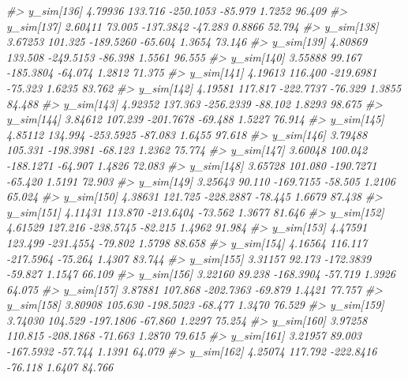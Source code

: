 \documentclass[
  10pt,
  italian,
  a4paper,
  extrafontsizes,onecolumn,openright
  ]{memoir}
\newenvironment{Shaded}{\begin{snugshade}}{\end{snugshade}}
\newcommand{\CommentTok}[1]{\textcolor[rgb]{0.56,0.35,0.01}{\textit{#1}}}
\begin{document}
\begin{Shaded}
\begin{Highlighting}[]
\CommentTok{\#\textgreater{}   y\_sim[136]  4.79936 133.716 {-}250.1053 {-}85.979  1.7252  96.409}
\CommentTok{\#\textgreater{}   y\_sim[137]  2.60411  73.005 {-}137.3842 {-}47.283  0.8866  52.794}
\CommentTok{\#\textgreater{}   y\_sim[138]  3.67253 101.325 {-}189.5260 {-}65.604  1.3654  73.146}
\CommentTok{\#\textgreater{}   y\_sim[139]  4.80869 133.508 {-}249.5153 {-}86.398  1.5561  96.555}
\CommentTok{\#\textgreater{}   y\_sim[140]  3.55888  99.167 {-}185.3804 {-}64.074  1.2812  71.375}
\CommentTok{\#\textgreater{}   y\_sim[141]  4.19613 116.400 {-}219.6981 {-}75.323  1.6235  83.762}
\CommentTok{\#\textgreater{}   y\_sim[142]  4.19581 117.817 {-}222.7737 {-}76.329  1.3855  84.488}
\CommentTok{\#\textgreater{}   y\_sim[143]  4.92352 137.363 {-}256.2339 {-}88.102  1.8293  98.675}
\CommentTok{\#\textgreater{}   y\_sim[144]  3.84612 107.239 {-}201.7678 {-}69.488  1.5227  76.914}
\CommentTok{\#\textgreater{}   y\_sim[145]  4.85112 134.994 {-}253.5925 {-}87.083  1.6455  97.618}
\CommentTok{\#\textgreater{}   y\_sim[146]  3.79488 105.331 {-}198.3981 {-}68.123  1.2362  75.774}
\CommentTok{\#\textgreater{}   y\_sim[147]  3.60048 100.042 {-}188.1271 {-}64.907  1.4826  72.083}
\CommentTok{\#\textgreater{}   y\_sim[148]  3.65728 101.080 {-}190.7271 {-}65.420  1.5191  72.903}
\CommentTok{\#\textgreater{}   y\_sim[149]  3.25643  90.110 {-}169.7155 {-}58.505  1.2106  65.024}
\CommentTok{\#\textgreater{}   y\_sim[150]  4.38631 121.725 {-}228.2887 {-}78.445  1.6679  87.438}
\CommentTok{\#\textgreater{}   y\_sim[151]  4.11431 113.870 {-}213.6404 {-}73.562  1.3677  81.646}
\CommentTok{\#\textgreater{}   y\_sim[152]  4.61529 127.216 {-}238.5745 {-}82.215  1.4962  91.984}
\CommentTok{\#\textgreater{}   y\_sim[153]  4.47591 123.499 {-}231.4554 {-}79.802  1.5798  88.658}
\CommentTok{\#\textgreater{}   y\_sim[154]  4.16564 116.117 {-}217.5964 {-}75.264  1.4307  83.744}
\CommentTok{\#\textgreater{}   y\_sim[155]  3.31157  92.173 {-}172.3839 {-}59.827  1.1547  66.109}
\CommentTok{\#\textgreater{}   y\_sim[156]  3.22160  89.238 {-}168.3904 {-}57.719  1.3926  64.075}
\CommentTok{\#\textgreater{}   y\_sim[157]  3.87881 107.868 {-}202.7363 {-}69.879  1.4421  77.757}
\CommentTok{\#\textgreater{}   y\_sim[158]  3.80908 105.630 {-}198.5023 {-}68.477  1.3470  76.529}
\CommentTok{\#\textgreater{}   y\_sim[159]  3.74030 104.529 {-}197.1806 {-}67.860  1.2297  75.254}
\CommentTok{\#\textgreater{}   y\_sim[160]  3.97258 110.815 {-}208.1868 {-}71.663  1.2870  79.615}
\CommentTok{\#\textgreater{}   y\_sim[161]  3.21957  89.003 {-}167.5932 {-}57.744  1.1391  64.079}
\CommentTok{\#\textgreater{}   y\_sim[162]  4.25074 117.792 {-}222.8416 {-}76.118  1.6407  84.766}

\end{Highlighting}
\end{Shaded}
\end{document}
